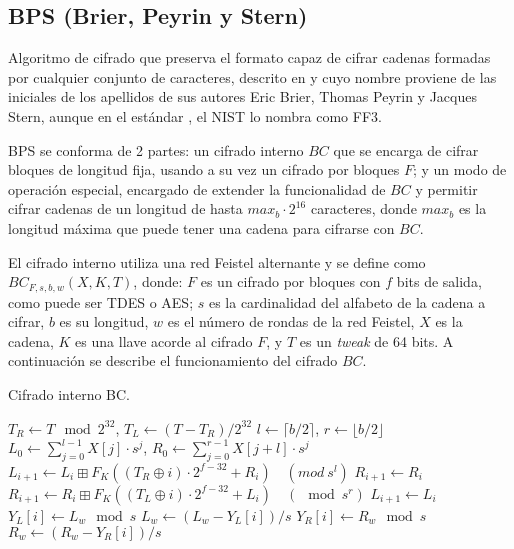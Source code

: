 %
%

\subsection{BPS (Brier, Peyrin y Stern)}


Algoritmo de cifrado que preserva el formato capaz de cifrar cadenas formadas
por cualquier conjunto de caracteres, descrito en \cite{bps} y cuyo nombre
proviene de las iniciales de los apellidos de sus autores Eric Brier, Thomas
Peyrin y Jacques Stern, aunque en el estándar \cite{nist_fpe}, el NIST lo
nombra como FF3.


BPS se conforma de 2 partes: un cifrado interno $BC$ que se encarga de cifrar
bloques de longitud fija, usando a su vez un cifrado por bloques $F$; y un modo
de operación especial, encargado de extender la funcionalidad de $BC$ y permitir
cifrar cadenas de un longitud de hasta $max_b \cdot 2^{16}$ caracteres, donde
$max_b$ es la longitud máxima que puede tener una cadena para cifrarse con $BC$.


El cifrado interno utiliza una red Feistel alternante y se define como
$BC_{F,s,b,w}(X,K,T)$, donde: $F$ es un cifrado por bloques con $f$ bits de
salida, como puede ser TDES o AES; $s$ es la cardinalidad del alfabeto de la
cadena a cifrar, $b$ es su longitud, $w$ es el número de rondas de la red
Feistel, $X$ es la cadena, $K$ es una llave acorde al cifrado $F$, y $T$ es
un \textit{tweak} de 64 bits. A continuación se describe el funcionamiento del
cifrado $BC$.

\begin{algorithm}
  \caption{\label{proceso_bc} Cifrado interno BC.}
  \begin{algorithmic}[1]
      \State $ T_R \gets T \mod 2^{32} $,
        $ T_L \gets (T - T_R) / 2^{32} $
      \State $ l \gets \lceil b/2 \rceil $,
        $ r \gets \lfloor b/2 \rfloor $
      \State $ L_0 \gets \sum_{j=0}^{l-1} X[j] \cdot s^j $,
        $ R_0 \gets \sum_{j=0}^{r-1} X[j+l] \cdot s^j $
          \State $ L_{i+1} \gets L_i \boxplus F_K((T_R \oplus i)
            \cdot 2^{f-32} + R_i)\quad (mod\ s^l) $
          \State $ R_{i+1} \gets R_i $
        \Else
          \State $ R_{i+1} \gets R_i \boxplus F_K((T_L \oplus i)
            \cdot 2^{f-32} + L_i)\quad (\mod s^r) $
          \State $ L_{i+1} \gets L_i $
        \EndIf
      \EndFor
        \State $ Y_L[i] \gets L_w \mod s $
        \State $ L_w \gets (L_w - Y_L[i])/s $
      \EndFor
        \State $ Y_R[i] \gets R_w \mod s $
        \State $ R_w \gets (R_w - Y_R[i])/s $
      \EndFor
      \State {}
    \EndFunction
  \end{algorithmic}
\end{algorithm}

